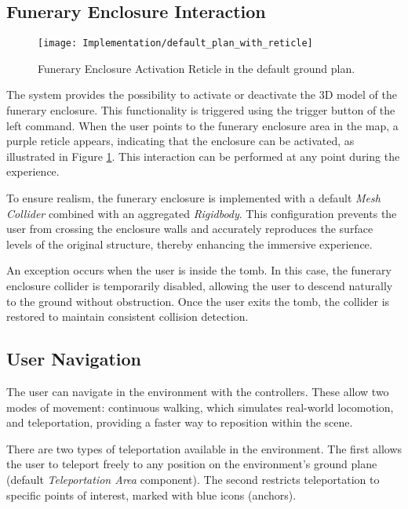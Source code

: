 \subsection*{Funerary Enclosure Interaction}
\label{sec:funerary_interaction}

 \begin{figure}[h!]
    \centering
    \texttt{[image: Implementation/default\_plan\_with\_reticle]}
    \caption{Funerary Enclosure Activation Reticle in the default ground plan.}
    \label{fig:funerary_interaction}    
\end{figure}

The system provides the possibility to activate or deactivate the \gls{3D} model of the funerary enclosure.
This functionality is triggered using the trigger button of the left command. When the user points to the funerary enclosure area in the map, a purple reticle appears, indicating that the enclosure can be activated, as illustrated in Figure \ref{fig:funerary_interaction}. This interaction can be performed at any point during the experience.

To ensure realism, the funerary enclosure is implemented with a default \emph{Mesh Collider} combined with an aggregated \emph{Rigidbody}. This configuration prevents the user from crossing the enclosure walls and accurately reproduces the surface levels of the original structure, thereby enhancing the immersive experience.

An exception occurs when the user is inside the tomb. In this case, the funerary enclosure collider is temporarily disabled, allowing the user to descend naturally to the ground without obstruction. Once the user exits the tomb, the collider is restored to maintain consistent collision detection.

\subsection*{User Navigation}
\label{sec:user_navigation}

The user can navigate in the environment with the controllers. 
These allow two modes of movement: continuous walking, which simulates real-world locomotion, and teleportation, providing a faster way to reposition within the scene.

There are two types of teleportation available in the environment. The first allows the user to teleport freely to any position on the environment’s ground plane (default \emph{Teleportation Area} component). The second restricts teleportation to specific points of interest, marked with blue icons (anchors).

